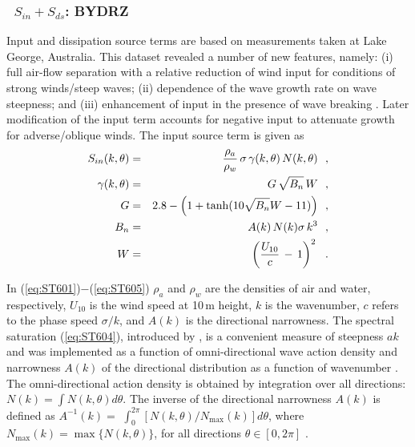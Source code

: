 \vsssub
\subsubsection{~$S_{in} + S_{ds}$: BYDRZ} \label{sec:ST6}
\vsssub


\noindent
Input and dissipation source terms are based on measurements taken at Lake
George, Australia. This dataset revealed a number of new features, namely: (i)
full air-flow separation with a relative reduction of wind input for
conditions of strong winds/steep waves; (ii) dependence of the wave growth
rate on wave steepness; and (iii) enhancement of input in the presence of wave
breaking \citep{art:Dea06,art:Bea07}. Later modification of the input term
accounts for negative input to attenuate growth for adverse/oblique winds.
The input source term is given as
\begin{eqnarray}
S_{in}(k,\theta) & = & \frac{\rho_a}{\rho_w}\, \sigma\,\gamma(k,\theta)\,N(k,\theta) \:\:\: ,
\label{eq:ST601} \\ \gamma(k,\theta) &=& G\,\sqrt{B_n}\,W \:\:\: ,
\label{eq:ST602} \\
G                &=& 2.8-\Bigl (1+\tanh (10\sqrt{B_n}W-11) \Bigr) \:\:\: ,
\label{eq:ST603} \\
B_n              &=& A(k)\,N(k)\sigma\,k^3 \:\:\: ,
\label{eq:ST604} \\
W                &=& \left (\frac{U_{10}}{c}\,-\,1 \right )^2 \:\:\: .
\label{eq:ST605}
\end{eqnarray}

\noindent
In (\ref{eq:ST601})$-$(\ref{eq:ST605}) $\rho_a$ and $\rho_w$ are the densities
of air and water, respectively, $U_{10}$ is the wind speed at 10\,m height,
$k$ is the wavenumber, $c$ refers to the phase speed $\sigma/k$, and $A(k)$ is the
directional narrowness. The spectral saturation (\ref{eq:ST604}), introduced
by \citet{art:Phi84}, is a convenient measure of steepness $ak$ and was
implemented as a function of omni-directional wave action density and
narrowness $A(k)$ of the directional distribution as a function of wavenumber
\citep{art:BGM02}.  The omni-directional action density is obtained by
integration over all directions: $N(k)=\int N(k,\theta)d\theta$.  \linebreak
The inverse of the directional narrowness $A(k)$ is defined as \linebreak
$A^{-1}(k) =$ $\int_{0}^{2\pi} [{N(k,\theta)}/{N_{\max}(k)}] d\theta$, where
$N_{\max}(k)=\max\bigl \{N(k,\theta)\bigr \}$, for all directions
$\theta\in[0,2\pi]$ \citep{art:BS87}.


